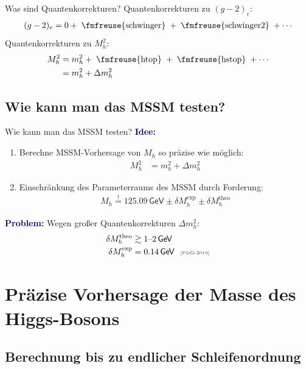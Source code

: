 \documentclass[hyperref={pdfpagelabels=false},ngerman]{beamer}
\newcommand{\fmfvcenter}[1]{\;\vcenter{\hbox{\fmfreuse{#1}}}\;}
\newcommand{\eh}[1]{\,\mathsf{#1}}
\newcommand{\mycite}[1]{\ensuremath{\text{\textcolor{darkgray}{\tiny [#1]}}}}
\renewcommand{\emph}[1]{\textbf{\textcolor{darkblue}{#1}}}
\newcommand{\GeV}{\eh{GeV}}
\begin{document}
\begin{frame}{Was sind Quantenkorrekturen?}
  Quantenkorrekturen zu $(g-2)_e$:
  \begin{align*}
    (g-2)_e = 0 + \fmfvcenter{schwinger} + \fmfvcenter{schwinger2} + \cdots
  \end{align*}
  Quantenkorrekturen zu $M_h^2$:
  \begin{align*}
    M_h^2 &= m_h^2 + \fmfvcenter{htop} + \fmfvcenter{hstop} + \cdots \\
          &= m_h^2 + \Delta m_h^2
  \end{align*}
\end{frame}

\subsection{Wie kann man das MSSM testen?}

\begin{frame}{Wie kann man das MSSM testen?}
  \emph{Idee:}
  \begin{enumerate}
  \item Berechne MSSM-Vorhersage von $M_h$ so präzise wie möglich:
  \begin{align*}
    M_h^2 &= m_h^2 + \Delta m_h^2
  \end{align*}
  \item Einschränkung des Parameterraums des MSSM durch Forderung:
    \begin{align*}
      M_h \overset{!}{=} 125.09 \GeV \pm \delta M_h^{\text{exp}} \pm \delta M_h^{\text{theo}}
    \end{align*}
  \end{enumerate}
  \emph{Problem:} Wegen großer Quantenkorrekturen $\Delta m_h^2$:
  \begin{align*}
    \delta M_h^{\text{theo}} &\gtrsim 1\text{--}2\GeV \\
    \delta M_h^{\text{exp}} &= 0.14\eh{GeV} \ \ \mycite{PDG-2019}
  \end{align*}
\end{frame}


\section{Präzise Vorhersage der Masse des Higgs-Bosons}

\subsection{Berechnung bis zu endlicher Schleifenordnung}
\end{document}

